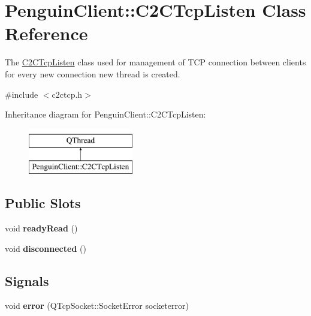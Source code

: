 \hypertarget{classPenguinClient_1_1C2CTcpListen}{\section{Penguin\-Client\-:\-:C2\-C\-Tcp\-Listen Class Reference}
\label{classPenguinClient_1_1C2CTcpListen}
}


The \hyperlink{classPenguinClient_1_1C2CTcpListen}{C2\-C\-Tcp\-Listen} class used for management of T\-C\-P connection between clients for every new connection new thread is created.  




{\ttfamily \#include $<$c2ctcp.\-h$>$}

Inheritance diagram for Penguin\-Client\-:\-:C2\-C\-Tcp\-Listen\-:\begin{figure}[H]
\begin{center}
\leavevmode
\includegraphics[height=2.000000cm]{classPenguinClient_1_1C2CTcpListen}
\end{center}
\end{figure}
\subsection*{Public Slots}
\begin{DoxyCompactItemize}
\item 
\hypertarget{classPenguinClient_1_1C2CTcpListen_ab2d0c106375767a5a3722216506000cb}{void {\bfseries ready\-Read} ()}\label{classPenguinClient_1_1C2CTcpListen_ab2d0c106375767a5a3722216506000cb}

\item 
\hypertarget{classPenguinClient_1_1C2CTcpListen_a1721622aeccb6cffeac7934cfd50e3b2}{void {\bfseries disconnected} ()}\label{classPenguinClient_1_1C2CTcpListen_a1721622aeccb6cffeac7934cfd50e3b2}

\end{DoxyCompactItemize}
\subsection*{Signals}
\begin{DoxyCompactItemize}
\item 
\hypertarget{classPenguinClient_1_1C2CTcpListen_aec51d539ea546e6e8e43b960f8d801c2}{void {\bfseries error} (Q\-Tcp\-Socket\-::\-Socket\-Error socketerror)}\label{classPenguinClient_1_1C2CTcpListen_aec51d539ea546e6e8e43b960f8d801c2}

\end{DoxyCompactItemize}
